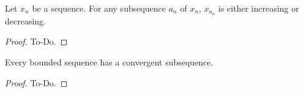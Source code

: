 \begin{lemma}\label{lem:subseqmonoincordec}
    Let $x_n$ be a sequence.
    For any subsequence $a_n$ of $x_n$,
    $x_{a_n}$ is either increasing or decreasing.
\end{lemma}
\begin{proof}
    To-Do.
\end{proof}

\begin{theorem}\label{thm:bolzano-weierstrass}
     \leanok
    Every bounded sequence has a convergent subsequence.
\end{theorem}
\begin{proof}
    To-Do.
\end{proof}
